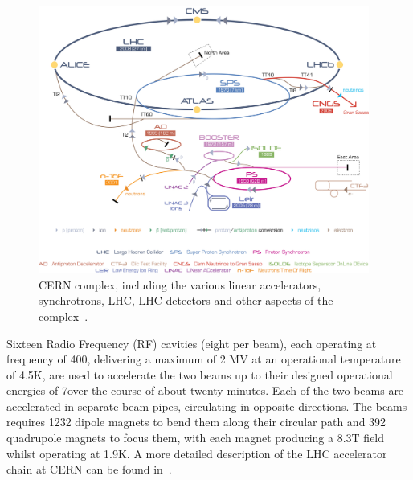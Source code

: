 \begin{figure}[htb]
\begin{center}
\includegraphics[width=0.97\textwidth]{figs/lhc/Cern-Accelerator-Complex.jpg}
\caption{CERN complex, including the various linear accelerators, synchrotrons, LHC, LHC detectors and other aspects of the complex~\cite{Marcastel:1621583}.}
\label{fig:cern-accelerator-complex}
\end{center}
\end{figure}

Sixteen Radio Frequency (RF) cavities (eight per beam), each operating at frequency of 400\MHz, delivering a maximum of 2 MV at an operational temperature of 4.5K, are used to accelerate the two beams up to their designed operational energies of 7\TeV over the course of about twenty minutes.
Each of the two beams are accelerated in separate beam pipes, circulating in opposite directions.
The beams requires 1232 dipole magnets to bend them along their circular path and 392 quadrupole magnets to focus them, with each magnet producing a 8.3T field whilst operating at 1.9K.
A more detailed description of the LHC accelerator chain at CERN can be found in~\cite{Schindl:397574}. 

